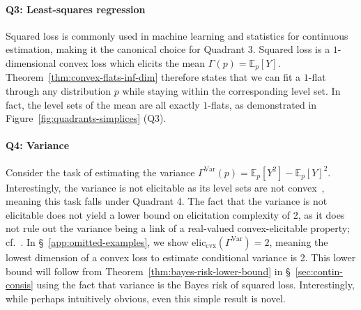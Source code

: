 \documentclass[11pt]{article} %
\newcommand{\Comments}{1}
\newcommand{\mytodo}[2]{\ifnum\Comments=1%
	\todo[linecolor=#1!80!black,backgroundcolor=#1,bordercolor=#1!80!black]{#2}\fi}
\newcommand{\jessiet}[1]{\mytodo{purple!20!white}{JF: #1}}
\newcommand{\eliccvx}{\mathrm{elic}_\mathrm{cvx}}
\newcommand{\E}{\mathbb{E}}
\newcommand{\Var}{\mathrm{Var}}
\begin{document}
\paragraph{Q3: Least-squares regression}
Squared loss is commonly used in machine learning and statistics for continuous estimation, making it the canonical choice for Quadrant 3.
Squared loss is a $1$-dimensional convex loss which elicits the mean $\Gamma(p) = \E_p[Y]$.
Theorem~\ref{thm:convex-flats-inf-dim} therefore states that we can fit a $1$-flat through any distribution $p$ while staying within the corresponding level set.
In fact, the level sets of the mean are all exactly $1$-flats, as demonstrated in Figure~\ref{fig:quadrants-simplices} (Q3).


\paragraph{Q4: Variance}
Consider the task of estimating the variance $\Gamma^\Var(p) = \E_p[Y^2] - \E_p[Y]^2$.
Interestingly, the variance is not elicitable as its level sets are not convex~\cite{osband1985providing,lambert2008eliciting}, meaning this task falls under Quadrant 4.
The fact that the variance is not elicitable does not yield a lower bound on elicitation complexity of 2, as it does not rule out the variance being a link of a real-valued convex-elicitable property; cf.~\citet[Remark 1]{frongillo2020elicitation}.
In \S~\ref{app:omitted-examples}, we show $\eliccvx(\Gamma^\Var)=2$, meaning the lowest dimension of a convex loss to estimate conditional variance is 2. %
This lower bound will follow from Theorem~\ref{thm:bayes-risk-lower-bound} in \S~\ref{sec:contin-consis} using the fact that variance is the Bayes risk of squared loss. %
Interestingly, while perhaps intuitively obvious, even this simple result is novel.
\end{document}
